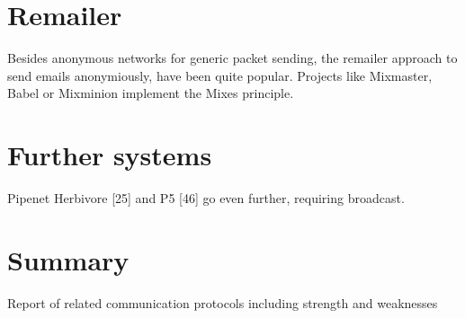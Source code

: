 \section{Remailer}
Besides anonymous networks for generic packet sending, the remailer approach
to send emails anonymiously, have been quite popular.
Projects like Mixmaster\cite{mixmaster}, 
Babel\cite{babel} or Mixminion\cite{mixminion} implement
the Mixes principle\cite{Chaum:1981:UEM:358549.358563}.
\section{Further systems}
Pipenet
Herbivore [25] and P5 [46]
go even further, requiring broadcast. 
\section{Summary}
Report of related communication protocols including strength and weaknesses
